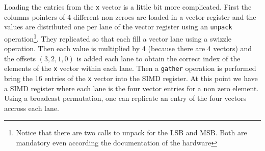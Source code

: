 \documentclass[10pt,conference,compsocconf]{IEEEtran}
\begin{document}
Loading the entries from the {\tt x} vector is a little bit more
complicated. First the columns pointers of 4 different non zeroes are
loaded in a vector register and the values are distributed one per
lane of the vector register using an {\tt unpack}
operation\footnote{Notice that there are two calls to unpack for the
  LSB and MSB. Both are mandatory even according the documentation of
  the hardware}. They replicated so that each fill a vector lane using
a swizzle operation. Then each value is multiplied by 4 (because there
are 4 vectors) and the offsets $(3,2,1,0)$ is added each lane to
obtain the correct index of the elements of the {\tt x} vector within
each lane. Then a {\tt gather} operation is performed bring the 16
entries of the {\tt x} vector into the SIMD register. At this point we
have a SIMD register where each lane is the four vector entries for a
non zero element. Using a broadcast permutation, one can replicate an
entry of the four vectors accross each lane.

\begin{figure}
  \centering

%


\end{figure}
\end{document}
